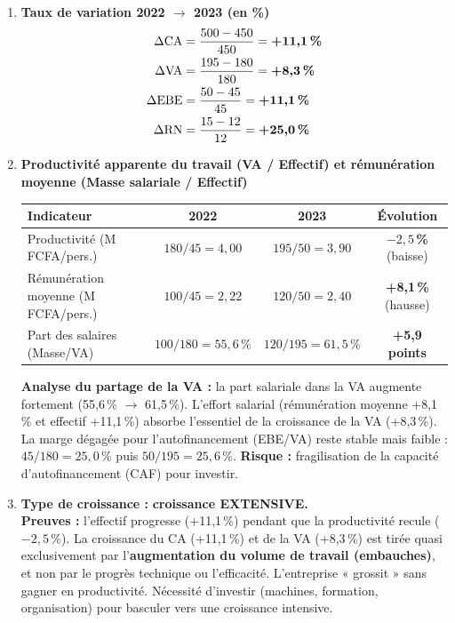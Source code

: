 \documentclass[11pt]{article}
\begin{document}
\begin{corrige}
\begin{enumerate}
    \item \textbf{Taux de variation 2022 $\rightarrow$ 2023 (en \%)}
    \begin{align*}
    \Delta\text{CA} &= \frac{500-450}{450} = \textbf{+11,1\,\%} \\
    \Delta\text{VA} &= \frac{195-180}{180} = \textbf{+8,3\,\%} \\
    \Delta\text{EBE} &= \frac{50-45}{45} = \textbf{+11,1\,\%} \\
    \Delta\text{RN} &= \frac{15-12}{12} = \textbf{+25,0\,\%}
    \end{align*}

    \item \textbf{Productivité apparente du travail (VA / Effectif) et rémunération moyenne (Masse salariale / Effectif)}
    \begin{center}
    \begin{tabular}{|l|c|c|c|}\hline
    \rowcolor{popblueL}
    \textbf{Indicateur} & \textbf{2022} & \textbf{2023} & \textbf{Évolution} \\ \hline
    Productivité (M FCFA/pers.) & $180/45 = 4,00$ & $195/50 = 3,90$ & \textbf{$-2,5$\,\%} (baisse) \\ \hline
    Rémunération moyenne (M FCFA/pers.) & $100/45 = 2,22$ & $120/50 = 2,40$ & \textbf{+8,1\,\%} (hausse) \\ \hline
    Part des salaires (Masse/VA) & $100/180 = 55,6\,\%$ & $120/195 = 61,5\,\%$ & \textbf{+5,9 points} \\ \hline
    \end{tabular}
    \end{center}
    \textbf{Analyse du partage de la VA :} la part salariale dans la VA augmente fortement (55,6\,\% $\rightarrow$ 61,5\,\%). L'effort salarial (rémunération moyenne +8,1\,\% et effectif +11,1\,\%) absorbe l'essentiel de la croissance de la VA (+8,3\,\%). La marge dégagée pour l'autofinancement (EBE/VA) reste stable mais faible : $45/180 = 25,0\,\%$ puis $50/195 = 25,6\,\%$. \textbf{Risque :} fragilisation de la capacité d'autofinancement (CAF) pour investir.

    \item \textbf{Type de croissance :} \textbf{croissance EXTENSIVE.} \\
    \textbf{Preuves :} l'effectif progresse (+11,1\,\%) pendant que la productivité recule ($-2,5$\,\%). La croissance du CA (+11,1\,\%) et de la VA (+8,3\,\%) est tirée quasi exclusivement par l'\textbf{augmentation du volume de travail (embauches)}, et non par le progrès technique ou l'efficacité. L'entreprise « grossit » sans gagner en productivité. Nécessité d'investir (machines, formation, organisation) pour basculer vers une croissance intensive.
\end{enumerate}
\end{corrige}
\end{document}
